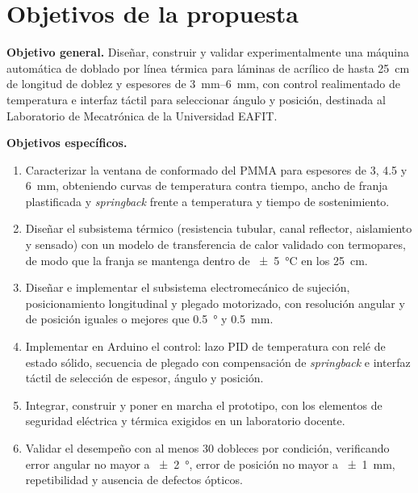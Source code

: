 \section{Objetivos de la propuesta}

\noindent\textbf{Objetivo general.} Diseñar, construir y validar experimentalmente una máquina automática de doblado por línea térmica para láminas de acrílico de hasta \SI{25}{\centi\meter} de longitud de doblez y espesores de \SIrange{3}{6}{\milli\meter}, con control realimentado de temperatura e interfaz táctil para seleccionar ángulo y posición, destinada al Laboratorio de Mecatrónica de la Universidad EAFIT.

\noindent\textbf{Objetivos específicos.}
\begin{enumerate}
\item Caracterizar la ventana de conformado del PMMA para espesores de \num{3}, \num{4.5} y \SI{6}{\milli\meter}, obteniendo curvas de temperatura contra tiempo, ancho de franja plastificada y \emph{springback} frente a temperatura y tiempo de sostenimiento.
\item Diseñar el subsistema térmico (resistencia tubular, canal reflector, aislamiento y sensado) con un modelo de transferencia de calor validado con termopares, de modo que la franja se mantenga dentro de \SI{\pm 5}{\celsius} en los \SI{25}{\centi\meter}.
\item Diseñar e implementar el subsistema electromecánico de sujeción, posicionamiento longitudinal y plegado motorizado, con resolución angular y de posición iguales o mejores que \SI{0.5}{\degree} y \SI{0.5}{\milli\meter}.
\item Implementar en Arduino el control: lazo PID de temperatura con relé de estado sólido, secuencia de plegado con compensación de \emph{springback} e interfaz táctil de selección de espesor, ángulo y posición.
\item Integrar, construir y poner en marcha el prototipo, con los elementos de seguridad eléctrica y térmica exigidos en un laboratorio docente.
\item Validar el desempeño con al menos \num{30} dobleces por condición, verificando error angular no mayor a \SI{\pm 2}{\degree}, error de posición no mayor a \SI{\pm 1}{\milli\meter}, repetibilidad y ausencia de defectos ópticos.
\end{enumerate}
